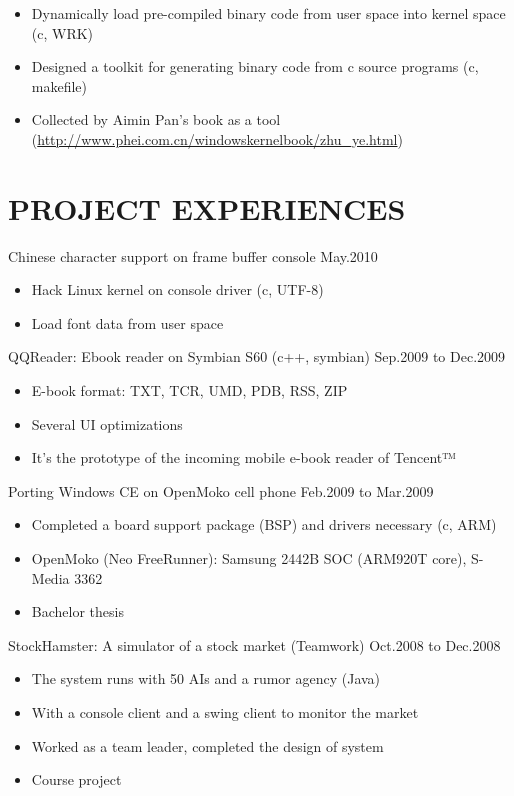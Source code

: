 \documentclass[11pt]{res} %
\begin{document}
\begin{resume}
\begin{itemize} \itemsep -2pt
\item Dynamically load pre-compiled binary code from user space into kernel space (c, WRK)
\item Designed a toolkit for generating binary code from c source programs (c, makefile)
\item Collected by Aimin Pan's book as a tool
  (\href{http://www.phei.com.cn/windowskernelbook/zhu\_ye.html}{http://www.phei.com.cn/windowskernelbook/zhu\_ye.html})
\end{itemize} 

\section{PROJECT EXPERIENCES}
Chinese character support on frame buffer console \hfill May.2010

\begin{itemize} \itemsep -2pt
\item Hack Linux kernel on console driver (c, UTF-8)
\item Load font data from user space
\end{itemize}

QQReader: Ebook reader on Symbian S60  (c++, symbian) \hfill Sep.2009 to Dec.2009

\begin{itemize} \itemsep -2pt
\item E-book format: TXT, TCR, UMD, PDB, RSS, ZIP
\item Several UI optimizations
\item It’s the prototype of the incoming mobile e-book reader of Tencent™
\end{itemize}

Porting Windows CE on OpenMoko cell phone \hfill Feb.2009 to Mar.2009

\begin{itemize} \itemsep -2pt
\item Completed a board support package (BSP) and drivers necessary (c, ARM)
\item OpenMoko (Neo FreeRunner): Samsung 2442B SOC (ARM920T core), S-Media 3362
\item Bachelor thesis
\end{itemize}

StockHamster: A simulator of a stock market (Teamwork) \hfill Oct.2008 to Dec.2008

\begin{itemize} \itemsep -2pt
\item The system runs with 50 AIs and a rumor agency (Java)
\item With a console client and a swing client to monitor the market
\item Worked as a team leader, completed the design of system
\item Course project
\end{itemize}


\end{resume}
\end{document}
